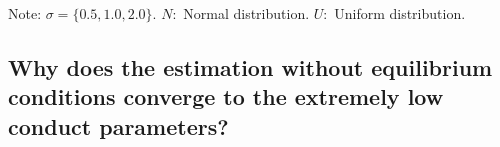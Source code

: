 \documentclass[11pt, a4paper]{article}
\theoremstyle{remark}
\begin{document}
\begin{table}[!htbp]
    \caption{True parameters and distributions}
    \label{tb:parameter_setting}
    \begin{center}
    \end{center}
    \footnotesize
    Note: $\sigma=\{0.5, 1.0, 2.0\}$. $N:$ Normal distribution. $U:$ Uniform distribution.
\end{table}

\subsection{Why does the estimation without equilibrium conditions converge to the extremely low conduct parameters?}\label{appendix:implausible_estimator}
\end{document}
